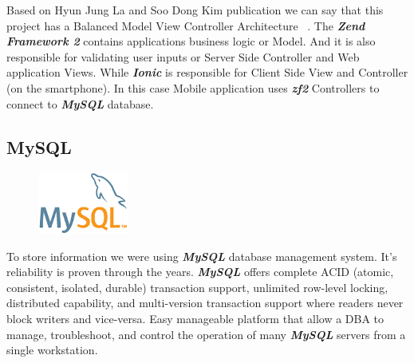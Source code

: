 

Based on Hyun Jung La and Soo Dong Kim publication we can say that this project has a Balanced Model View Controller Architecture ~\cite{MVC_Architecture_for_Developing_Service-based_Mobile_Applications}. The \textbf{\textit{Zend Framework 2}} contains applications business logic or Model. And it is also responsible for validating user inputs or Server Side Controller and  Web application Views. While \textbf{\textit{Ionic}} is responsible for Client Side View and Controller (on the smartphone). In this case Mobile application uses \textbf{\textit{zf2}} Controllers to connect to \textbf{\textit{MySQL}} database.

    \subsection{MySQL}
\begin{figure}
	\includegraphics[width=3cm]{img/zf2/mysql-logo.png}
\end{figure} 
To store information we were using \textbf{\textit{MySQL}} database management system. It's reliability is proven through the years. \textbf{\textit{MySQL}} offers complete ACID (atomic, consistent, isolated, durable) transaction support, unlimited row-level locking, distributed capability, and multi-version transaction support where readers never block writers and vice-versa. Easy manageable platform that allow a DBA to manage, troubleshoot, and control the operation of many \textbf{\textit{MySQL}} servers from a single workstation. ~\cite{MySQL_Top10_Reasons}

